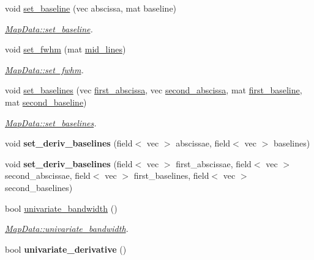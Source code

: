 \begin{DoxyCompactItemize}
void \hyperlink{class_map_data_a5894d1e395e80ba4c15e22438bc21bd3}{set\+\_\+baseline} (vec abscissa, mat baseline)
\begin{DoxyCompactList}\small\item\em \hyperlink{class_map_data_a5894d1e395e80ba4c15e22438bc21bd3}{Map\+Data\+::set\+\_\+baseline}. \end{DoxyCompactList}\item 
void \hyperlink{class_map_data_a2520ff301a4e5460f9e138f86298b66e}{set\+\_\+fwhm} (mat \hyperlink{class_map_data_a95f9011ac33e065d58f2bf26b0db9580}{mid\+\_\+lines})
\begin{DoxyCompactList}\small\item\em \hyperlink{class_map_data_a2520ff301a4e5460f9e138f86298b66e}{Map\+Data\+::set\+\_\+fwhm}. \end{DoxyCompactList}\item 
void \hyperlink{class_map_data_a214dc643b724e8d0094e440e70f66b4b}{set\+\_\+baselines} (vec \hyperlink{class_map_data_a6c73650238e622489f4ba5ae580e0c84}{first\+\_\+abscissa}, vec \hyperlink{class_map_data_a16fba2ab43dd4480662a2a1d76611352}{second\+\_\+abscissa}, mat \hyperlink{class_map_data_a02dfe98d659e8eac8bf8eec4c376223f}{first\+\_\+baseline}, mat \hyperlink{class_map_data_afd3efd4d5aad351c03f2a68d62deaa4a}{second\+\_\+baseline})
\begin{DoxyCompactList}\small\item\em \hyperlink{class_map_data_a214dc643b724e8d0094e440e70f66b4b}{Map\+Data\+::set\+\_\+baselines}. \end{DoxyCompactList}\item 
void {\bfseries set\+\_\+deriv\+\_\+baselines} (field$<$ vec $>$ abscissae, field$<$ vec $>$ baselines)\hypertarget{class_map_data_a193e6d54e676b22c1f5ad041d684ac82}{}\label{class_map_data_a193e6d54e676b22c1f5ad041d684ac82}

\item 
void {\bfseries set\+\_\+deriv\+\_\+baselines} (field$<$ vec $>$ first\+\_\+abscissae, field$<$ vec $>$ second\+\_\+abscissae, field$<$ vec $>$ first\+\_\+baselines, field$<$ vec $>$ second\+\_\+baselines)\hypertarget{class_map_data_ace4aff9baedc4693803d175b64d5996a}{}\label{class_map_data_ace4aff9baedc4693803d175b64d5996a}

\item 
bool \hyperlink{class_map_data_af54e11703d6d0d276e056fc5302b5e7c}{univariate\+\_\+bandwidth} ()
\begin{DoxyCompactList}\small\item\em \hyperlink{class_map_data_af54e11703d6d0d276e056fc5302b5e7c}{Map\+Data\+::univariate\+\_\+bandwidth}. \end{DoxyCompactList}\item 
bool {\bfseries univariate\+\_\+derivative} ()\hypertarget{class_map_data_a12eb07285acbbc6aac1cb78d71422ebe}{}\label{class_map_data_a12eb07285acbbc6aac1cb78d71422ebe}


\end{DoxyCompactItemize}
